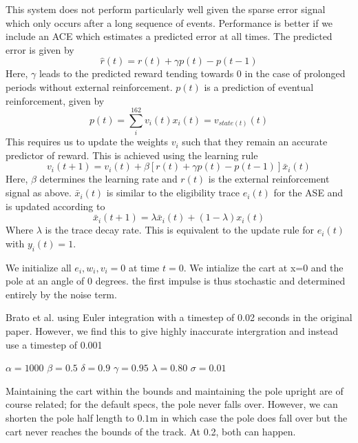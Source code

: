 \documentclass{article}
\begin{document}
This system does not perform particularly well given the sparse error signal which only occurs after a long sequence of events. Performance is better if we include an ACE which estimates a predicted error at all times.
The predicted error is given by
\begin{equation}
\hat r(t) = r(t) + \gamma p(t) - p(t-1)
\end{equation}
Here, $\gamma$ leads to the predicted reward tending towards 0 in the case of prolonged periods without external reinforcement.
$p(t)$ is a prediction of eventual reinforcement, given by
\begin{equation}
p(t) = \sum_i^{162}{v_i(t)x_i(t) = v_{state(t)}(t)}
\end{equation}
This requires us to update the weights $v_i$ such that they remain an accurate predictor of reward. This is achieved using the learning rule
\begin{equation}
v_i(t+1) = v_i(t) + \beta[r(t) + \gamma p(t) - p(t-1)] \bar x_i(t)
\end{equation}
Here, $\beta$ determines the learning rate and $r(t)$ is the external reinforcement signal as above. $\bar x_i(t)$ is similar to the eligibility trace $e_i(t)$ for the ASE and is updated according to
\begin{equation}
\bar x_i(t+1) = \lambda \bar x_i(t) + (1-\lambda)x_i(t) 
\end{equation}
Where $\lambda$ is the trace decay rate. This is equivalent to the update rule for $e_i(t)$ with $y_i(t) = 1$.


We initialize all $e_i, w_i, v_i = 0$ at time $t=0$.
We intialize the cart at x=0 and the pole at an angle of 0 degrees. the first impulse is thus stochastic and determined entirely by the noise term.

Brato et al. using Euler integration with a timestep of 0.02 seconds in the original paper. However, we find this to give highly inaccurate intergration and instead use a timestep of 0.001

$\alpha = 1000$
$\beta = 0.5$
$\delta = 0.9$
$\gamma = 0.95$
$\lambda = 0.80$
$\sigma = 0.01$



Maintaining the cart within the bounds and maintaining the pole upright are of course related; for the default specs, the pole never falls over. However, we can shorten the pole half length to $0.1$m in which case the pole does fall over but the cart never reaches the bounds of the track. At 0.2, both can happen.
\end{document}
